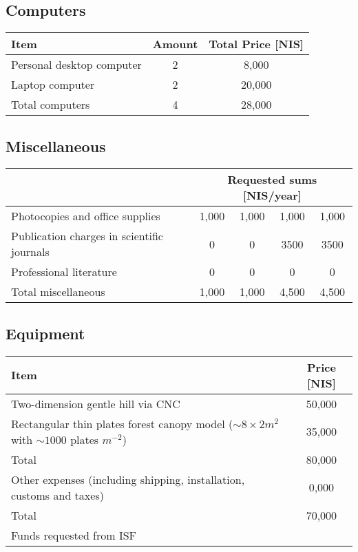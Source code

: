 \documentclass[a4paper,12pt]{report}
\begin{document}
\subsection*{Computers}

\begin{table}[h!]
\centering
\begin{tabular}{|l|c|c|}
\hline
  Item  & Amount & Total Price [NIS] \\
\hline
Personal desktop computer & 2 & 8,000  \\
\hline 
Laptop computer & 2 & 20,000\\
\hline
\hline
Total  computers & 4 & 28,000\\
\hline
\end{tabular}
\end{table}


\subsection*{Miscellaneous }

\begin{table}[h!]
\centering
\begin{tabular}{|l|c|c|c|c|}
\hline
    & \multicolumn{4}{|c|}{Requested sums [NIS/year]} \\
\hline
 Photocopies and office supplies& 
1,000 & 1,000 & 1,000 & 1,000 \\
\hline
Publication charges in scientific journals &  
0 & 0 & 3500 & 3500 \\
\hline
Professional literature &
0 & 0 & 0 & 0\\
\hline\hline
Total miscellaneous & 
1,000 & 1,000 & 4,500 & 4,500\\
\hline
\end{tabular}
\end{table}



\subsection*{Equipment } 
\begin{table}[h!]
\centering
\begin{tabular}{|l|c|}
\hline
  Item  & Price [NIS] \\
\hline
Two-dimension gentle hill via CNC & 50,000  \\
\hline
Rectangular thin plates forest canopy model ($\sim 8\times 2 m^2$ with $\sim 1000$ plates $m^{-2}$) & 35,000\\
\hline
\hline
Total & 80,000\\
\hline
Other expenses (including shipping,
installation, customs and taxes) & 0,000 \\
\hline
\hline
\hline
Total & 70,000 \\
\hline
 Funds requested from ISF & \\
 \hline
\end{tabular}
\end{table}
\end{document}
